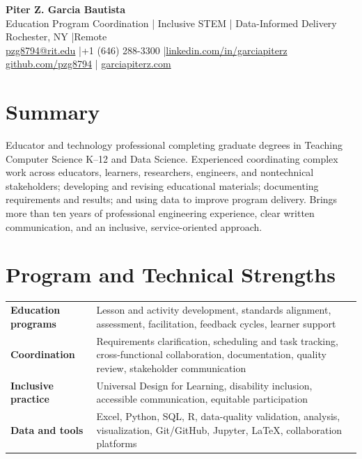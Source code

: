 \documentclass[10pt,letterpaper]{article}
\begin{document}
\fontsize{9}{10.5}\selectfont
\begin{center}
{\Large\bfseries Piter Z. Garcia Bautista}\\[1pt]
{\large Education Program Coordination | Inclusive STEM | Data-Informed Delivery}\\[2pt]
Rochester, NY \enspace|\enspace Remote\\
\href{mailto:pzg8794@rit.edu}{pzg8794@rit.edu} \enspace|\enspace +1 (646) 288-3300
\enspace|\enspace \href{https://linkedin.com/in/garciapiterz}{linkedin.com/in/garciapiterz}\\
\href{https://github.com/pzg8794}{github.com/pzg8794} \enspace|\enspace
\href{https://garciapiterz.com}{garciapiterz.com}
\end{center}

\section*{Summary}
Educator and technology professional completing graduate degrees in Teaching
Computer Science K--12 and Data Science. Experienced coordinating complex work
across educators, learners, researchers, engineers, and nontechnical
stakeholders; developing and revising educational materials; documenting
requirements and results; and using data to improve program delivery. Brings
more than ten years of professional engineering experience, clear written
communication, and an inclusive, service-oriented approach.

\section*{Program and Technical Strengths}
\begin{tabularx}{\textwidth}{@{}>{\bfseries}l X@{}}
Education programs & Lesson and activity development, standards alignment, assessment, facilitation, feedback cycles, learner support\\
Coordination & Requirements clarification, scheduling and task tracking, cross-functional collaboration, documentation, quality review, stakeholder communication\\
Inclusive practice & Universal Design for Learning, disability inclusion, accessible communication, equitable participation\\
Data and tools & Excel, Python, SQL, R, data-quality validation, analysis, visualization, Git/GitHub, Jupyter, LaTeX, collaboration platforms\\
\end{tabularx}
\end{document}
